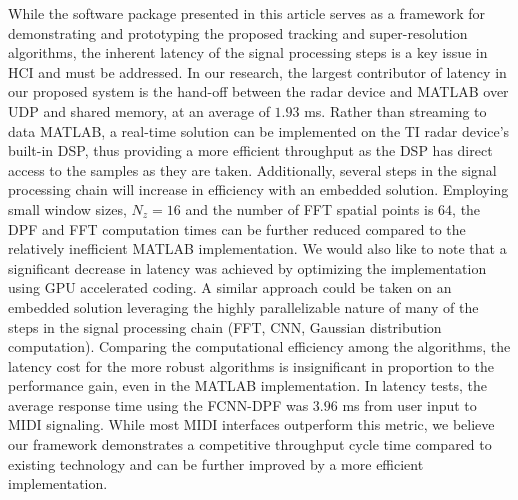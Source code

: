 \documentclass[10pt,journal,final]{IEEEtran}
\begin{document}
While the software package presented in this article serves as a framework for demonstrating and prototyping the proposed tracking and super-resolution algorithms, the inherent latency of the signal processing steps is a key issue in HCI and must be addressed.
In our research, the largest contributor of latency in our proposed system is the hand-off between the radar device and MATLAB over UDP and shared memory, at an average of $1.93$ ms. 
Rather than streaming to data MATLAB, a real-time solution can be implemented on the TI radar device's built-in DSP, thus providing a more efficient throughput as the DSP has direct access to the samples as they are taken. 
Additionally, several steps in the signal processing chain will increase in efficiency with an embedded solution.
Employing small window sizes, $N_z = 16$ and the number of FFT spatial points is $64$, the DPF and FFT computation times can be further reduced compared to the relatively inefficient MATLAB implementation.
We would also like to note that a significant decrease in latency was achieved by optimizing the implementation using GPU accelerated coding.
A similar approach could be taken on an embedded solution leveraging the highly parallelizable nature of many of the steps in the signal processing chain (FFT, CNN, Gaussian distribution computation).
Comparing the computational efficiency among the algorithms, the latency cost for the more robust algorithms is insignificant in proportion to the performance gain, even in the MATLAB implementation.
In latency tests, the average response time using the FCNN-DPF was $3.96$ ms from user input to MIDI signaling.
While most MIDI interfaces outperform this metric, we believe our framework demonstrates a competitive throughput cycle time compared to existing technology and can be further improved by a more efficient implementation.
\end{document}
